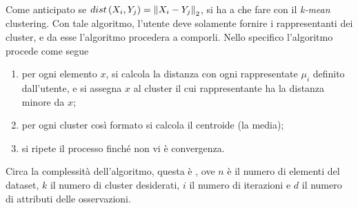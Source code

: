 \documentclass{subfiles}
\begin{document}
Come anticipato se $dist\left(X_{i}, Y_{j}\right) = \Norm{X_{i} - Y_{j}}[2]$, si ha a che fare con il \emph{k-mean} clustering.
Con tale algoritmo, l'utente deve solamente fornire i rappresentanti dei cluster, e da esse l'algoritmo procedera a comporli.
Nello specifico l'algoritmo procede come segue
\begin{enumerate}
    \item per ogni elemento $x$, si calcola la distanza con ogni rappresentate \(\mu_{i}\) definito dall'utente,
          e si assegna $x$ al cluster il cui rappresentante ha la distanza minore da $x$;
    \item per ogni cluster così formato si calcola il centroide (la media);
    \item si ripete il processo finché non vi è convergenza\footnotemark[2].
\end{enumerate}

Circa la complessità dell'algoritmo, questa è , ove $n$ è il numero di elementi del dataset, $k$ il numero di cluster desiderati,
$i$ il numero di iterazioni e $d$ il numero di attributi delle osservazioni.
\end{document}
